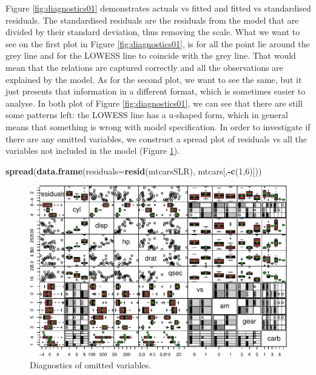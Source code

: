 \documentclass[
]{book}
\newenvironment{Shaded}{\begin{snugshade}}{\end{snugshade}}
\newcommand{\DataTypeTok}[1]{\textcolor[rgb]{0.13,0.29,0.53}{#1}}
\newcommand{\DecValTok}[1]{\textcolor[rgb]{0.00,0.00,0.81}{#1}}
\newcommand{\KeywordTok}[1]{\textcolor[rgb]{0.13,0.29,0.53}{\textbf{#1}}}
\newcommand{\NormalTok}[1]{#1}
\newcommand{\OperatorTok}[1]{\textcolor[rgb]{0.81,0.36,0.00}{\textbf{#1}}}
\theoremstyle{definition}
\theoremstyle{definition}
\theoremstyle{definition}
\theoremstyle{definition}
\theoremstyle{remark}
\begin{document}
Figure \ref{fig:diagnostics01} demonstrates actuals vs fitted and fitted vs standardised residuals. The standardised residuals are the residuals from the model that are divided by their standard deviation, thus removing the scale. What we want to see on the first plot in Figure \ref{fig:diagnostics01}, is for all the point lie around the grey line and for the LOWESS line to coincide with the grey line. That would mean that the relations are captured correctly and all the observations are explained by the model. As for the second plot, we want to see the same, but it just presents that information in a different format, which is sometimes easier to analyse. In both plot of Figure \ref{fig:diagnostics01}, we can see that there are still some patterns left: the LOWESS line has a u-shaped form, which in general means that something is wrong with model specification. In order to investigate if there are any omitted variables, we construct a spread plot of residuals vs all the variables not included in the model (Figure \ref{fig:diagnostics02}).

\begin{Shaded}
\begin{Highlighting}[]
\KeywordTok{spread}\NormalTok{(}\KeywordTok{data.frame}\NormalTok{(}\DataTypeTok{residuals=}\KeywordTok{resid}\NormalTok{(mtcarsSLR), mtcars[,}\OperatorTok{{-}}\KeywordTok{c}\NormalTok{(}\DecValTok{1}\NormalTok{,}\DecValTok{6}\NormalTok{)]))}
\end{Highlighting}
\end{Shaded}

\begin{figure}
\centering
\includegraphics{Svetunkov---Statistics-for-Business-Analytics_files/figure-latex/diagnostics02-1.pdf}
\caption{\label{fig:diagnostics02}Diagnostics of omitted variables.}
\end{figure}
\end{document}
